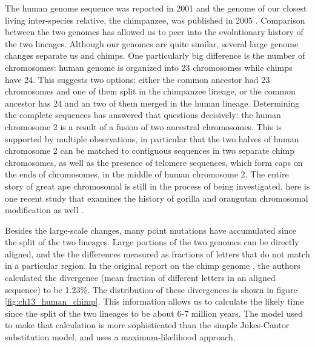 \documentclass[
]{book}
\theoremstyle{definition}
\theoremstyle{definition}
\theoremstyle{definition}
\theoremstyle{remark}
\begin{document}
The human genome sequence was reported in 2001 and the genome of our closest living inter-species relative, the chimpanzee, was published in 2005 \citep{consortium_initial_2005}. Comparison between the two genomes has allowed us to peer into the evolutionary history of the two lineages. Although our genomes are quite similar, several large genome changes separate us and chimps. One particularly big difference is the number of chromosomes: human genome is organized into 23 chromosomes while chimps have 24. This suggests two options: either the common ancestor had 23 chromosomes and one of them split in the chimpanzee lineage, or the common ancestor has 24 and an two of them merged in the human lineage. Determining the complete sequences has answered that questions decisively: the human chromosome 2 is a result of a fusion of two ancestral chromosomes. This is supported by multiple observations, in particular that the two halves of human chromosome 2 can be matched to contiguous sequences in two separate chimp chromosomes, as well as the presence of telomere sequences, which form caps on the ends of chromosomes, in the middle of human chromosome 2. The entire story of great ape chromosomal is still in the process of being investigated, here is one recent study that examines the history of gorilla and orangutan chromosomal modification as well \citep{ventura_evolution_2012}.

Besides the large-scale changes, many point mutations have accumulated since the split of the two lineages. Large portions of the two genomes can be directly aligned, and the the differences measured as fractions of letters that do not match in a particular region. In the original report on the chimp genome \citep{consortium_initial_2005}, the authors calculated the divergence (mean fraction of different letters in an aligned sequence) to be 1.23\%. The distribution of these divergences is shown in figure \ref{fig:ch13_human_chimp}. This information allows us to calculate the likely time since the split of the two lineages to be about 6-7 million years. The model used to make that calculation is more sophisticated than the simple Jukes-Cantor substitution model, and uses a maximum-likelihood approach.
\end{document}
